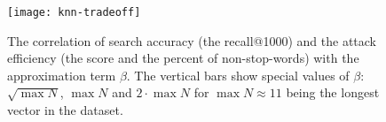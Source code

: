 \begin{figure}[h]
	\centering
	\texttt{[image: knn-tradeoff]} %
	\caption[The correlation of search accuracy and the attack efficiency with $\beta$]{
		The correlation of search accuracy (the {\color{MatplotlibThree}recall@1000}) and the attack efficiency (the {\color{MatplotlibOne}\FOne{} score} and the {\color{MatplotlibTwo}percent of non-stop-words}) with the approximation term $\beta$.
		The {\color{magenta}vertical bars} show special values of $\beta$: $\sqrt{\max N}$, $\max N$ and $2 \cdot \max N$ for $\max N \approx 11$ being the longest vector in the dataset.
	}\label{figure:knn-tradeoff}
\end{figure}
